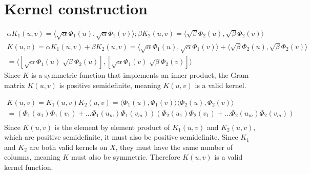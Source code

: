 \documentclass{article}
\begin{document}
\section{Kernel construction}
\begin{equation}
\begin{split}
\alpha K_1(u,v) = \langle \sqrt{\alpha} \Phi_1 (u), \sqrt{\alpha} \Phi_1 (v) \rangle ;  \beta K_2(u,v) = \langle \sqrt{\beta} \Phi_2 (u), \sqrt{\beta} \Phi_2 (v) \rangle  \\
K(u,v) = \alpha K_1 (u,v) + \beta K_2 (u,v) = \langle \sqrt{\alpha} \Phi_1 (u), \sqrt{\alpha} \Phi_1 (v) \rangle + \langle \sqrt{\beta} \Phi_2 (u), \sqrt{\beta} \Phi_2 (v) \rangle \\
= \langle [\sqrt{\alpha} \Phi_1 (u) \; \sqrt{\beta} \Phi_2 (u)] , [ \sqrt{\alpha} \Phi_1 (v) \; \sqrt{\beta} \Phi_2 (v) ] \rangle
\end{split}
\end{equation}
Since \(K\) is a symmetric function that implements an inner product, the Gram matrix \(K(u,v)\) is positive semidefinite, meaning \(K(u,v)\) is a valid kernel.

\begin{equation}
\begin{split}
K(u,v) = K_1(u,v) K_2(u,v) = \langle \Phi_1 (u), \Phi_1 (v) \rangle \langle \Phi_2 (u), \Phi_2 (v) \rangle \\
= ( \Phi_1 (u_1)\Phi_1 (v_1) + ... \Phi_1 (u_m)\Phi_1 (v_m) )( \Phi_2 (u_1)\Phi_2 (v_1) + ... \Phi_2 (u_m)\Phi_2 (v_m) ) \\
\end{split}
\end{equation}
Since \(K(u,v) \) is the element by element product of \(K_1(u,v)\) and \( K_2(u,v)\), which are positive semidefinite, it must also be positive semidefinite. Since 
\(K_1\) and \( K_2\) are both valid kernels on \( X \), they must have the same number of columns, meaning \( K \) must also be symmetric. Therefore \( K(u,v) \)  is a valid kernel function.
\end{document}

